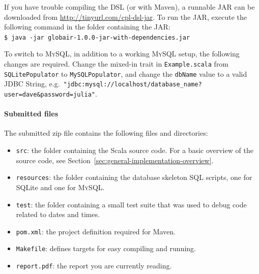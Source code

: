 \documentclass[a4paper]{article}
\newcommand{\cc}[1]{\texttt{#1}}
\renewcommand{\sc}[1]{\lstinline{#1}}
\begin{document}
If you have trouble compiling the DSL (or with Maven), a runnable JAR can be downloaded from \url{http://tinyurl.com/cpl-dsl-jar}.
To run the JAR, execute the following command in the folder containing the JAR:\\
\cc{\$ java -jar globair-1.0.0-jar-with-dependencies.jar}


To switch to \textsc{MySQL}, in addition to a working \textsc{MySQL} setup, the following changes are required.
Change the mixed-in trait in \cc{Example.scala} from \cc{SQLite\-Populator} to \cc{MySQL\-Populator}, and change the \sc{dbName} value to a valid JDBC String, e.g.\ {\color{Thistle}\cc{"jdbc:mysql://localhost/database\_name?user=dave\&password=julia"}}.

\vspace{-1em}
\paragraph{Submitted files}
The submitted zip file contains the following files and directories:

\begin{itemize}
\item \cc{src}: the folder containing the Scala source code.
  For a basic overview of the source code, see Section~\ref{sec:general-implementation-overview}.
\item \cc{resources}: the folder containing the database skeleton SQL scripts, one for SQLite and one for \textsc{MySQL}\@.
\item \cc{test}: the folder containing a small test suite that was used to debug code related to dates and times.
\item \cc{pom.xml}: the project definition required for Maven.
\item \cc{Makefile}: defines targets for easy compiling and running.
\item \cc{report.pdf}: the report you are currently reading.
\end{itemize}
\end{document}
